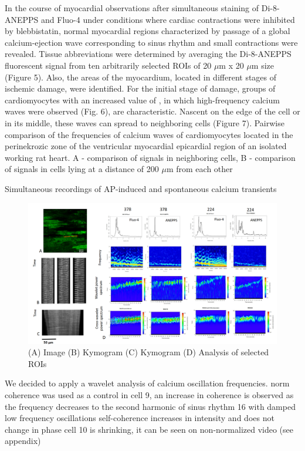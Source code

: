 \documentclass{biophys-new}
\begin{document}
In the course of myocardial observations after simultaneous staining of Di-8-ANEPPS and Fluo-4 under conditions where cardiac contractions were inhibited by blebbistatin, normal myocardial regions characterized by passage of a global calcium-ejection wave corresponding to sinus rhythm and small contractions were revealed. Tissue abbreviations were determined by averaging the Di-8-ANEPPS fluorescent signal from ten arbitrarily selected ROIs of 20 $\mu$m x 20 $\mu$m size (Figure 5). Also, the areas of the myocardium, located in different stages of ischemic damage, were identified. For the initial stage of damage, groups of cardiomyocytes with an increased value of , in which high-frequency calcium waves were observed (Fig. 6), are characteristic. Nascent on the edge of the cell or in its middle, these waves can spread to neighboring cells (Figure 7).
Pairwise comparison of the frequencies of calcium waves of cardiomyocytes located in the perinekrozic zone of the ventricular myocardial epicardial region of an isolated working rat heart. A - comparison of signals in neighboring cells, B - comparison of signals in cells lying at a distance of 200 $\mu$m from each other

Simultaneous recordings of AP-induced and spontaneous calcium transients

\begin{figure}[hbt!]
\centering
\includegraphics[width=0.9\linewidth]{fig10.png}
\caption{ (A) Image (B) Kymogram (C) Kymogram (D) Analysis of selected ROIs }
\label{fig:fig10}
\end{figure}

We decided to apply a wavelet analysis of calcium oscillation frequencies. \cite{addison2018introduction}
norm coherence was used as a control
in cell 9, an increase in coherence is observed as the frequency decreases to the second harmonic of sinus rhythm
16 with damped low frequency oscillations
self-coherence increases in intensity and does not change in phase
cell 10 is shrinking, it can be seen on non-normalized video (see appendix)
\end{document}
